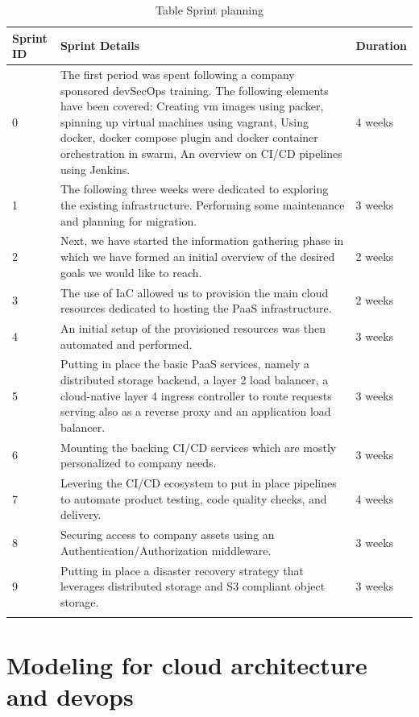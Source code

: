 \begin{longtable}[H]{|m{2cm}|m{10cm}|m{2cm}|}
\hline
 {\textbf{Sprint ID}} & {\textbf{Sprint Details }} & {\textbf{Duration }} \\ \hline 
0 
&
The first period was spent following a company sponsored devSecOps training. The following elements have been covered: 
Creating vm images using packer, spinning up virtual machines using vagrant,  
Using docker, docker compose plugin and docker container orchestration in swarm, 
An overview on CI/CD pipelines using Jenkins. 
&
4 weeks  \\
\hline
1 
&
The following three weeks were dedicated to exploring the existing infrastructure. Performing some maintenance and planning for migration. 
&
3 weeks  \\ \hline
2 
&
Next, we have started the information gathering phase in which we have formed an initial overview of the desired goals we would like to reach. 
&
2 weeks \\ \hline
3 
&
The use of IaC allowed us to provision the main cloud resources dedicated to hosting the PaaS infrastructure. 
&
2 weeks \\ \hline
4 
&
An initial setup of the provisioned resources was then automated and performed. 
&
3 weeks \\ \hline
5 
&
Putting in place the basic PaaS services, namely a distributed storage backend, a layer 2 load balancer, a cloud-native layer 4 ingress controller to route requests serving also as a reverse proxy and an application load balancer. 
&
3 weeks \\ \hline
6 
&
Mounting the backing CI/CD services which are mostly personalized to company needs. 
&
3 weeks \\ \hline
7 
&
Levering the CI/CD ecosystem to put in place pipelines to automate product testing, code quality checks, and delivery. 
&
4 weeks \\ \hline
8 
&
Securing access to company assets using an Authentication/Authorization middleware. 
&
3 weeks \\ \hline
9 
&
Putting in place a disaster recovery strategy that leverages distributed storage and S3 compliant object storage. 
&
3 weeks \\ \hline

\caption{Table Sprint planning}
\end{longtable}


\section{Modeling for cloud architecture and devops }

